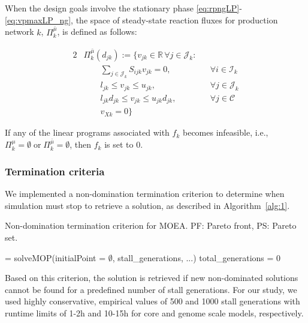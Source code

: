 When the design goals involve the stationary phase \eqref{eq:rpngLP}-\eqref{eq:vpmaxLP_ng}, the space of steady-state reaction fluxes for production network $k$, $\Pi_k^{\bar{\mu}}$, is defined as follows:

\begin{alignat}{2}
	\nonumber	& \Pi_k^{\bar{\mu}}(d_{jk}):=\{v_{jk}\in\mathbb{R}\, \forall j \in \mathcal{J}_k: \\
		&\qquad	\sum_{j\in \mathcal{J}_k} S_{ijk} v_{jk} =0,  && \forall i\in \mathcal{I}_k 		\label{eq:piNG1}\\
		&\qquad l_{jk}  \le v_{jk} \le u_{jk},  && \forall j\in \mathcal{J}_k 					\label{eq:piNG2}\\
		&\qquad l_{jk} d_{jk} \le v_{jk} \le u_{jk} d_{jk}, && \forall j\in \mathcal{C} 	\label{eq:piNG3}\\
		&\qquad v_{Xk} = 0	\label{eq:piNG6} \}
\end{alignat}

If any of the linear programs associated with $f_k$ becomes infeasible, i.e., $\Pi_k^{\mu}=\emptyset \; \text{or}\; \Pi_k^{\bar{\mu}}=\emptyset$, then $f_k$ is set to $0$.
\subsubsection{Termination criteria}
We implemented a non-domination termination criterion to determine when simulation must stop to retrieve a solution, as described in Algorithm~\ref{alg:1}.

\begin{algorithm}
		\caption{Non-domination termination criterion for MOEA. PF: Pareto front, PS: Pareto set.} \label{alg:1}
	\DontPrintSemicolon
	[PF, PS] = solveMOP(initialPoint = $\emptyset$, 	stall\_generations, ...) \;
	total\_generations = 0 \;
\end{algorithm}

Based on this criterion, the solution is retrieved if new non-dominated solutions cannot be found for a predefined number of stall generations. For our study, we used highly conservative, empirical values of 500 and 1000 stall generations with runtime limits of 1-2h and 10-15h for core and genome scale models, respectively.

